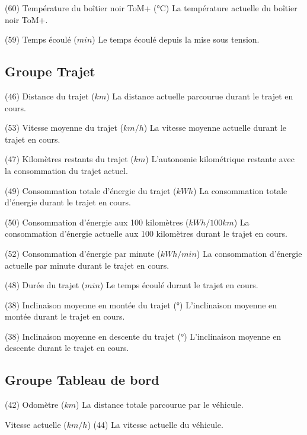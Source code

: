 {(60) Température du boîtier noir ToM+ (°C)}
{La température actuelle du boîtier noir ToM+.}

{(59) Temps écoulé (\(min\))}
{Le temps écoulé depuis la mise sous tension.}

\subsection{Groupe Trajet}

{(46) Distance du trajet (\(km\))}
{La distance actuelle parcourue durant le trajet en cours.}

{(53) Vitesse moyenne du trajet (\(km/h\))}
{La vitesse moyenne actuelle durant le trajet en cours.}

{(47) Kilomètres restants du trajet (\(km\))}
{L'autonomie kilométrique restante avec la consommation du trajet actuel.}

{(49) Consommation totale d'énergie du trajet (\(kWh\))}
{La consommation totale d'énergie durant le trajet en cours.}

{(50) Consommation d'énergie aux 100 kilomètres (\(kWh/100km\))}
{La consommation d'énergie actuelle aux 100 kilomètres durant le trajet en cours.}

{(52) Consommation d'énergie par minute (\(kWh/min\))}
{La consommation d'énergie actuelle par minute durant le trajet en cours.}

{(48) Durée du trajet (\(min\))}
{Le temps écoulé durant le trajet en cours.}

{(38) Inclinaison moyenne en montée du trajet (°)}
{L'inclinaison moyenne en montée durant le trajet en cours.}

{(38) Inclinaison moyenne en descente du trajet (°)}
{L'inclinaison moyenne en descente durant le trajet en cours.}

\subsection{Groupe Tableau de bord}

{(42) Odomètre (\(km\))}
{La distance totale parcourue par le véhicule.}

{Vitesse actuelle (\(km/h\))}
{(44) La vitesse actuelle du véhicule.}

